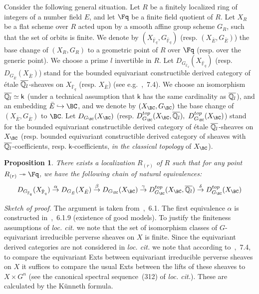 \documentclass[11pt]{amsart}
\newtheorem{prop}{Proposition}
\theoremstyle{definition}
\theoremstyle{remark}
\theoremstyle{remark}
\newcommand{\Qlbar}{{\overline {{\Bbb Q}_l} }}
\newcommand{\<}{\langle}
\renewcommand{\>}{\rangle}
\newcommand{\Fqbar}{{\bar{\mathbb F}_q}}
\newcommand{\kk}{\mathsf k}
\begin{document}
Consider the following general situation. Let $R$ be a finitely localized
ring of integers of a number field $E$, 
and let $\Fq$ be a finite field quotient of $R$. Let $X_R$ be a flat scheme
over $R$ acted upon by a smooth affine group scheme $G_R$, such that the set of
orbits is finite. 
We denote by 
$(X_{\Fqbar},G_{\Fqbar})$ (resp. $(X_{\bar E},G_{\bar E})$) the base change
of $(X_R,G_R)$ to a geometric point of $R$ over $\Fq$ (resp. over the 
generic point). We choose a prime $l$ invertible in $R$.
Let $D_{G_{\Fqbar}}(X_{\Fqbar})$ (resp. $D_{G_{\bar E}}(X_{\bar E})$) stand 
for the bounded equivariant constructible derived category of 
{\'e}tale $\Qlbar$-sheaves on $X_{\Fqbar}$ (resp. $X_{\bar E}$)
(see e.g.~\cite{BD},~7.4).
We choose an isomorphism $\Qlbar\simeq\kk$
(under a technical assumption that $\kk$ has the same cardinality 
as $\Qlbar$), and an embedding 
${\bar E}\hookrightarrow\BC$, and we denote by $(X_\BC,G_\BC)$ the base
change of $(X_{\bar E},G_{\bar E})$ to $\BC$. 
Let $D_{G_\BC}(X_\BC)$ (resp. $D_{G_\BC}^{top}(X_\BC,\Qlbar),\
D_{G_\BC}^{top}(X_\BC)$) stand for the bounded equivariant constructible
derived category of {\'e}tale $\Qlbar$-sheaves on $X_\BC$ (resp.
bounded equivariant constructible derived category of sheaves with
$\Qlbar$-coefficients, resp. $\kk$-coefficients, 
{\em in the classical topology} of $X_\BC$).

\begin{prop}
\label{bbdd}
There exists a localization $R_{(r)}$ of $R$ such that for any point
$R_{(r)}\twoheadrightarrow\Fq$, we have the following 
chain of natural equivalences:
$$D_{G_{\Fqbar}}(X_{\Fqbar})\stackrel{\alpha}{\to}
D_{G_{\bar E}}(X_{\bar E})\stackrel{\beta}{\to}
D_{G_\BC}(X_\BC)\stackrel{\gamma}{\to}
D_{G_\BC}^{top}(X_\BC,\Qlbar)\stackrel{\delta}{\to}
D_{G_\BC}^{top}(X_\BC)$$
\end{prop}

{\em Sketch of proof.} The argument is taken from~\cite{BBD},~6.1.
The first equivalence $\alpha$ is constructed
in~\cite{BBD},~6.1.9 (existence of good
models). To justify the finiteness assumptions of {\em loc. cit.} we note
that the set of isomorphism classes of $G$-equivariant irreducible perverse
sheaves on $X$ is finite. Since the equivariant derived categories are not
considered in {\em loc. cit.} we note that according to~\cite{BD},~7.4,
to compare the equivariant Exts between equivariant irreducible perverse 
sheaves on $X$ it suffices to compare the usual Exts between the lifts of
these sheaves to $X\times G^n$ (see the canonical spectral sequence~(312) of
{\em loc. cit.}). These are calculated by the K{\"u}nneth formula.
\end{document}
